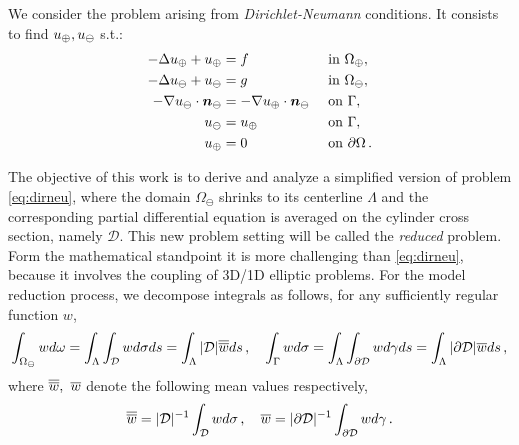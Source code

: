 \documentclass[r]{siamart171218}
\begin{document}
We consider the problem arising from \emph{Dirichlet-Neumann} conditions. 
It consists to find $u_{\oplus},u_{\ominus}$ s.t.:
\begin{subequations}\label{eq:dirneu}
\begin{align}
\label{eq:dirneu1}
- \Delta \up  + \up &= f  && \text{ in } \Omega_{\oplus},\\
\label{eq:dirneu2}
- \Delta \uf  + \uf &= g  && \text{ in } \Omega_\ominus,\\
\label{eq:dirneu3}
-\nabla \uf \cdot \nn_{\ominus} &= -\nabla \up \cdot \nn_{\ominus}  && \text{ on } \Gamma,\\
\label{eq:dirneu4}
\uf &= \up && \text{ on }  \Gamma,\\
\label{eq:dirneu5}
\up &= 0 && \text{ on } \partial \Omega\,.
\end{align}
\end{subequations}

The objective of this work is to derive and analyze a simplified version of problem \eqref{eq:dirneu}, where the domain $\Omega_\ominus$ shrinks to its centerline $\Lambda$ and the corresponding partial differential equation is averaged on the cylinder cross section, namely $\mathcal{D}$. This new problem setting will be called the \emph{reduced} problem. Form the mathematical standpoint it is more challenging than \eqref{eq:dirneu}, because it involves the coupling of 3D/1D elliptic problems.
For the model reduction process, we decompose integrals as follows, for any sufficiently regular function $w$,
\begin{equation*}
\int_{\Omega_\ominus} w d\omega 
= \int_\Lambda \int_{\mathcal{D}} w d\sigma ds
= \int_\Lambda |\mathcal{D}|\overline{\overline{w}} ds\,,
\quad
\int_{\Gamma} w d\sigma 
= \int_\Lambda \int_{\partial\mathcal{D}} w d\gamma ds
= \int_\Lambda  |\partial \mathcal{D}| \overline{w} ds\,,
\end{equation*}
where $\overline{\overline{w}}, \ \overline{w}$ denote the following mean values respectively,
\begin{equation*}
\overline{\overline{w}} = |\mathcal{D}|^{-1} \int_{\mathcal{D}} w d\sigma\,,
\quad
\overline{w} = |\partial\mathcal{D}|^{-1} \int_{\partial\mathcal{D}} w d\gamma\,.
\end{equation*}
\end{document}
